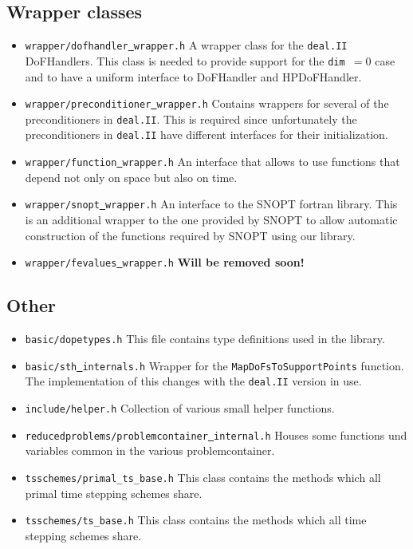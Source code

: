 \subsection{Wrapper classes}
\begin{itemize}
  \item \texttt{wrapper/dofhandler\underline{ }wrapper.h} A wrapper class for the \texttt{deal.II} DoFHandlers. This 
    class is needed to provide support for the \texttt{dim $= 0$} case and to have a uniform interface to 
    DoFHandler and HPDoFHandler.
  \item \texttt{wrapper/preconditioner\underline{ }wrapper.h} Contains wrappers for several of the preconditioners
    in \texttt{deal.II}. This is required since unfortunately the preconditioners in \texttt{deal.II} have different
    interfaces for their initialization.
  \item \texttt{wrapper/function\underline{ }wrapper.h} An interface that allows to use functions that depend 
    not only on space but also on time.
  \item \texttt{wrapper/snopt\underline{ }wrapper.h} An interface to the SNOPT fortran library. This is an additional
    wrapper to the one provided by SNOPT to allow automatic construction of the functions required 
    by SNOPT using our library.
  \item \texttt{wrapper/fevalues\underline{ }wrapper.h} {\bf Will be removed soon!}
\end{itemize}

\subsection{Other}
\begin{itemize}
  \item \texttt{basic/dopetypes.h} This file contains type definitions used in the library. 
\item \texttt{basic/sth\underline{ }internals.h} Wrapper for the \texttt{MapDoFsToSupportPoints} function. The implementation of this changes with the \texttt{deal.II} version in use.
\item \texttt{include/helper.h} Collection of various small helper functions.
\item \texttt{reducedproblems/problemcontainer\underline{ }internal.h} Houses some functions und variables common in the various problemcontainer.
\item \texttt{tsschemes/primal\_ts\_base.h}  This class contains the methods which all primal time stepping schemes share.
\item \texttt{tsschemes/ts\_base.h}  This class contains the methods which all time stepping schemes share.
\end{itemize}
